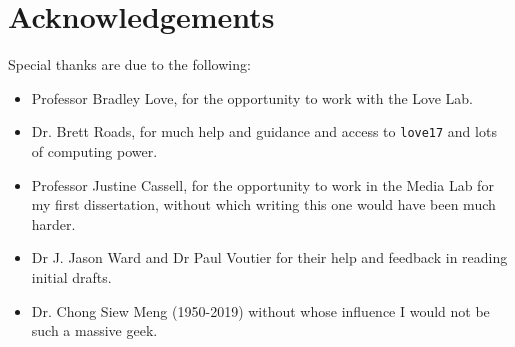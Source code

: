 
\newpage
\section*{Acknowledgements}

Special thanks are due to the following:

\begin{itemize}
    \item Professor Bradley Love, for the opportunity to work with the Love Lab.
    \item Dr. Brett Roads, for much help and guidance and access to \texttt{love17} and lots of computing power. 
    \item Professor Justine Cassell, for the opportunity to work in the Media Lab for my first dissertation, without which writing this one would have been much harder. 
    \item Dr J. Jason Ward and Dr Paul Voutier for their help and feedback in reading initial drafts.
    \item Dr. Chong Siew Meng (1950-2019) without whose influence I would not be such a massive geek.
\end{itemize}